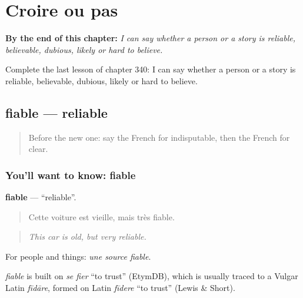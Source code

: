 
\chapter{Croire ou pas}
\label{ch:fr-croire-ou-pas}

\begin{chapteropening}
\textbf{By the end of this chapter:} \emph{I can say whether a person or a story is reliable, believable, dubious, likely or hard to believe.}

Complete the last lesson of chapter 340: I can say whether a person or a story is reliable, believable, dubious, likely or hard to believe.
\end{chapteropening}

\section[fiable]{fiable — reliable}

\label{lesson:FR-C340-fiable}



\begin{quote}
Before the new one: say the French for indisputable, then the French for clear.
\end{quote}

\subsection*{You'll want to know: fiable}
\textbf{fiable} — \textquotedblleft{}reliable\textquotedblright{}.

\begin{quote}
Cette voiture est vieille, mais très fiable.
\end{quote}

\begin{quote}
\emph{This car is old, but very reliable.}
\end{quote}

For people and things: \emph{une source fiable}.

\begin{cousinweb}
\emph{fiable} is built on \emph{se fier} \textquotedblleft{}to trust\textquotedblright{} (EtymDB), which is usually traced to a Vulgar Latin \emph{fīdāre}, formed on Latin \emph{fīdere} \textquotedblleft{}to trust\textquotedblright{} (Lewis \& Short).
\end{cousinweb}

